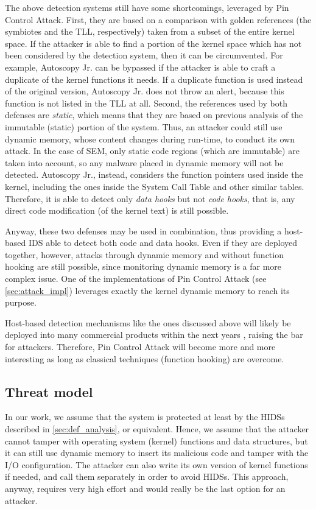 The above detection systems still have some shortcomings, leveraged by Pin Control Attack.
First, they are based on a comparison with golden references (the symbiotes and the TLL, respectively) taken from a subset of the entire kernel space.
If the attacker is able to find a portion of the kernel space which has not been considered by the detection system, then it can be circumvented.
For example, Autoscopy Jr. can be bypassed if the attacker is able to craft a duplicate of the kernel functions it needs.
If a duplicate function is used instead of the original version, Autoscopy Jr. does not throw an alert, because this function is not listed in the TLL at all.
Second, the references used by both defenses are \emph{static}, which means that they are based on previous analysis of the immutable (static) portion of the system.
Thus, an attacker could still use dynamic memory, whose content changes during run-time, to conduct its own attack.
In the case of SEM, only static code regions (which are immutable) are taken into account, so any malware placed in dynamic memory will not be detected.
Autoscopy Jr., instead, considers the function pointers used inside the kernel, including the ones inside the System Call Table and other similar tables.
Therefore, it is able to detect only \emph{data hooks} but not \emph{code hooks}, that is, any direct code modification (\eg of the kernel text) is still possible.

Anyway, these two defenses may be used in combination, thus providing a host-based IDS able to detect both code and data hooks.
Even if they are deployed together, however, attacks through dynamic memory and without function hooking are still possible,
since monitoring dynamic memory is a far more complex issue. One of the implementations of Pin Control Attack (see \sec \ref{sec:attack_impl})
leverages exactly the kernel dynamic memory to reach its purpose.

Host-based detection mechanisms like the ones discussed above will likely be deployed into many commercial products within the next years \cite{symbiote_web, autoscopy_web},
raising the bar for attackers. Therefore, Pin Control Attack will become more and more interesting as long as classical techniques (\eg function hooking) are overcome.


\subsection{Threat model}

In our work, we assume that the system is protected at least by the HIDSs described in \sec \ref{sec:def_analysis}, or equivalent.
Hence, we assume that the attacker cannot tamper with operating system (kernel) functions and data structures, but it can still use dynamic memory to insert its malicious code
and tamper with the I/O configuration. The attacker can also write its own version of kernel functions if needed, and call them separately in order to avoid HIDSs.
This approach, anyway, requires very high effort and would really be the last option for an attacker.

